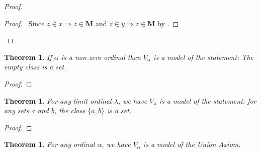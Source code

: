 \documentclass{book}
\let\qed\relax
\newtheorem{thm}[ax]{Theorem}
\theoremstyle{definition}
\begin{document}
\begin{proof}
\pf
{}
\begin{proof}
	\pf\ Since $z \in x \Rightarrow z \in \mathbf{M}$ and $z \in y \Rightarrow z \in \mathbf{M}$ by .
\end{proof}
\qed
\end{proof}

\begin{thm}
\label{thm:modelEmptySet}
If $\alpha$ is a non-zero ordinal then $V_\alpha$ is a model of the statement: The empty class is a set.
\end{thm}

\begin{proof}
\pf
{}
\qed
\end{proof}

\begin{thm}
\label{thm:modelPairing}
For any limit ordinal $\lambda$, we have $V_\lambda$ is a model of the statement: for any sets $a$ and $b$, the class $\{ a,b \}$ is a set.
\end{thm}

\begin{proof}
\pf
{}
\qed
\end{proof}

\begin{thm}
\label{thm:modelUnion}
For any ordinal $\alpha$, we have $V_\alpha$ is a model of the Union Axiom.
\end{thm}
\end{document}
